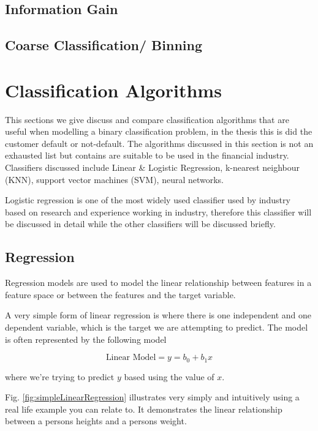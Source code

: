 \subsection{Information Gain}
\subsection{Coarse Classification/ Binning}
\section{Classification Algorithms}
This sections we give discuss and compare classification algorithms that are useful when modelling a binary classification problem, in the thesis this is did the customer default or not-default. The algorithms discussed in this section is not an exhausted list but contains are suitable to be used in the financial industry. Classifiers discussed include Linear \& Logistic Regression, k-nearest neighbour (KNN), support vector machines (SVM), neural networks. 

Logistic regression is one of the most widely used classifier used by industry based on research and experience working in industry, therefore this classifier will be discussed in detail while the other classifiers will be discussed briefly.

\subsection{Regression} \label{Reg}
Regression models are used to model the linear relationship between features in a feature space or between the features and the target variable. 

A very simple form of linear regression is where there is one independent and one dependent variable, which is the target we are attempting to predict. The model is often represented by the following model

\begin{equation} \label{eq:reg}
\text{Linear Model} = y = b_0 + b_1x
\end{equation}

where we're trying to predict $y$ based using the value of $x$.

Fig. \ref{fig:simpleLinearRegression} illustrates very simply and intuitively using a real life example you can relate to. It demonstrates the linear relationship between a persons heights and a persons weight.

